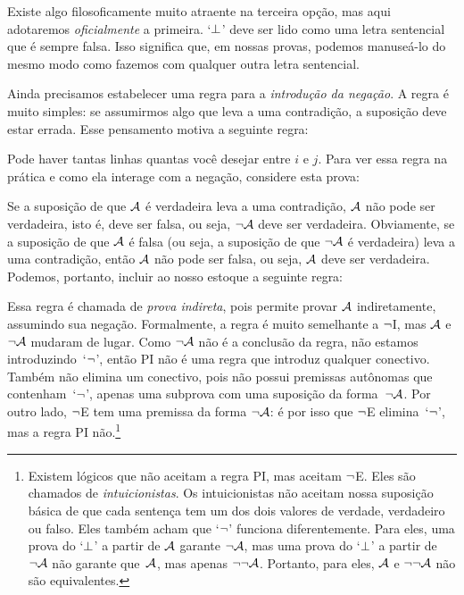 Existe algo filosoficamente  muito atraente na terceira opção, mas aqui adotaremos \emph{oficialmente} a primeira. `$\bot$'  deve ser lido como uma letra sentencial que é sempre falsa. Isso significa que, em nossas provas, podemos manuseá-lo do mesmo modo como fazemos com qualquer outra letra sentencial.

Ainda precisamos estabelecer uma regra para a \textit{introdução da negação}. A regra é muito simples: se assumirmos algo que leva a uma contradição, a suposição deve estar errada. Esse pensamento motiva a seguinte regra:

Pode haver tantas linhas quantas você desejar entre $i$ e $j$. Para ver essa regra na prática e como ela interage com a negação, considere esta prova: 
	\begin{fitchproof}
		\open
		\close
	\end{fitchproof}

Se a suposição de que $\mathcal{A}$ é verdadeira leva a uma contradição, $\mathcal{A}$ não pode ser verdadeira, isto é, deve ser falsa, ou seja, $\neg\mathcal{A}$ deve ser verdadeira. Obviamente, se a suposição de que $\mathcal{A}$ é falsa (ou seja, a suposição de que $\neg\mathcal{A}$ é verdadeira)  leva a uma contradição, então $\mathcal{A}$ não pode ser falsa, ou seja, $\mathcal{A}$ deve ser verdadeira. Podemos, portanto, incluir ao nosso estoque a seguinte regra:

Essa regra é chamada de \emph{prova indireta}, pois permite provar $\mathcal{A}$  indiretamente, assumindo sua negação. Formalmente, a regra é muito semelhante a $\neg$I, mas $\mathcal{A}$ e $\neg\mathcal{A}$ mudaram de lugar. Como $\neg\mathcal{A}$ não é a conclusão da regra, não estamos introduzindo~`$\neg$', então  PI não é uma regra que introduz qualquer conectivo. Também não elimina um conectivo, pois não possui premissas autônomas que contenham~`$\neg$', apenas uma subprova com uma suposição da forma~$\neg\mathcal{A}$. Por outro lado, $\neg$E tem uma premissa da forma $\neg\mathcal{A}$: é por isso que $\neg$E elimina~`$\neg$', mas a regra PI não.\footnote{
	Existem lógicos que não aceitam a regra PI, mas aceitam $\neg$E. Eles são chamados de \textit{intuicionistas}. Os intuicionistas não aceitam nossa suposição básica de que cada sentença tem um dos dois valores de verdade, verdadeiro ou falso. Eles também acham que  `$\neg$' funciona diferentemente. Para eles, uma prova do `$\bot$' a partir de $\mathcal{A}$ garante $\neg \mathcal{A}$, mas uma prova do `$\bot$' a partir de $\neg\mathcal{A}$ não garante que~$\mathcal{A}$, mas apenas $\neg\neg\mathcal{A}$. Portanto, para eles, $\mathcal{A}$ e $\neg\neg\mathcal{A}$ não são equivalentes.}


